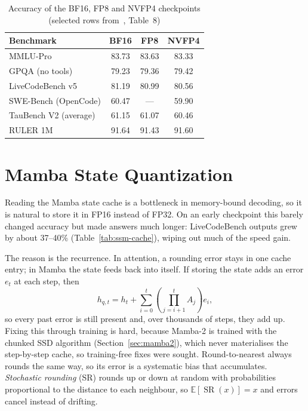 \begin{table}[!htbp]
\centering
\small
\caption[Accuracy of the BF16, FP8 and NVFP4 checkpoints]{Accuracy of the
BF16, FP8 and NVFP4 checkpoints (selected rows from~\cite{nvidia2026super},
Table~8)}
\label{tab:quant-eval}
\begin{tabular}{@{}lccc@{}}
\toprule
\textbf{Benchmark} & \textbf{BF16} & \textbf{FP8} & \textbf{NVFP4} \\
\midrule
MMLU-Pro & 83.73 & 83.63 & 83.33 \\
GPQA (no tools) & 79.23 & 79.36 & 79.42 \\
LiveCodeBench v5 & 81.19 & 80.99 & 80.56 \\
SWE-Bench (OpenCode) & 60.47 & --- & 59.90 \\
TauBench V2 (average) & 61.15 & 61.07 & 60.46 \\
RULER 1M & 91.64 & 91.43 & 91.60 \\
\bottomrule
\end{tabular}
\end{table}

\section{Mamba State Quantization}

Reading the Mamba state cache is a bottleneck in memory-bound decoding, so it
is natural to store it in FP16 instead of FP32. On an early checkpoint this
barely changed accuracy but made answers much longer: LiveCodeBench outputs
grew by about 37--40\% (Table~\ref{tab:ssm-cache}), wiping out much of the
speed gain.

The reason is the recurrence. In attention, a rounding error stays in one
cache entry; in Mamba the state feeds back into itself. If storing the state
adds an error $e_t$ at each step, then~\cite{nvidia2026super}
\begin{equation}
  h_{q,t} = h_t + \sum_{i=0}^{t} \left( \prod_{j=i+1}^{t} A_j \right) e_i ,
  \label{eq:error-accum}
\end{equation}
so every past error is still present and, over thousands of steps, they add
up. Fixing this through training is hard, because Mamba-2 is trained with the
chunked SSD algorithm (Section~\ref{sec:mamba2}), which never materialises the
step-by-step cache, so training-free fixes were sought. Round-to-nearest always rounds the same way, so its error is a systematic
bias that accumulates. \emph{Stochastic rounding} (SR) rounds up or down at
random with probabilities proportional to the distance to each neighbour, so
$\mathbb{E}[\operatorname{SR}(x)] = x$ and errors cancel instead of drifting.

